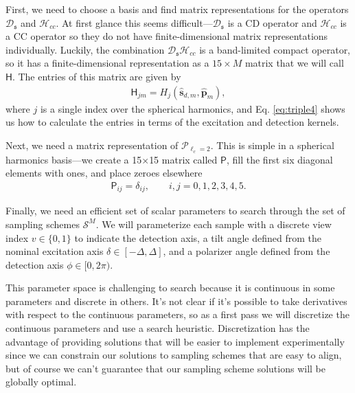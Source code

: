 \documentclass[11pt]{article}
\providecommand{\mc}[1]{\mathcal{#1}}
\providecommand{\mh}[1]{\mathbf{\hat{#1}}}
\providecommand{\mf}[1]{\mathfrak{#1}}
\providecommand{\ms}[1]{\mathsf{#1}}
\providecommand{\mbb}[1]{\mathbb{#1}}
\begin{document}
First, we need to choose a basis and find matrix representations for the
operators $\mc{D}_{\mf{s}}$ and $\mc{H}_{cc}$. At first glance this seems
difficult---$\mc{D}_{\mf{s}}$ is a CD operator and $\mc{H}_{cc}$ is a CC
operator so they do not have finite-dimensional matrix representations
individually. Luckily, the combination $\mc{D}_{\mf{s}} \mc{H}_{cc}$ is a
band-limited compact operator, so it has a finite-dimensional representation as
a $15\times M$ matrix that we will call $\ms{H}$. The entries of this matrix are
given by
\begin{align}
  \ms{H}_{jm} = H_j(\mh{s}_{d,m}, \mh{p}_m),
\end{align}
where $j$ is a single index over the spherical harmonics, and Eq.
\ref{eq:triple4} shows us how to calculate the entries in terms
of the excitation and detection kernels. 

Next, we need a matrix representation of $\mc{P}_{\ell_c=2}$. This is simple in
a spherical harmonics basis---we create a 15$\times$15 matrix called
$\ms{P}$, fill the first six diagonal elements with ones, and place zeroes
elsewhere
\begin{align}
  \ms{P}_{ij} = \delta_{ij}, \qquad i,j = 0,1,2,3,4,5.
\end{align}


Finally, we need an efficient set of scalar parameters to search through the set
of sampling schemes $\mc{S}^M$. We will parameterize each sample with a discrete
view index $v \in \{0, 1\}$ to indicate the detection axis, a tilt angle defined
from the nominal excitation axis $\delta \in [-\Delta, \Delta]$, and a polarizer
angle defined from the detection axis $\phi \in [0, 2\pi)$.

This parameter space is challenging to search because it is continuous in some
parameters and discrete in others. It's not clear if it's possible to take
derivatives with respect to the continuous parameters, so as a first pass we
will discretize the continuous parameters and use a search heuristic.
Discretization has the advantage of providing solutions that will be easier to
implement experimentally since we can constrain our solutions to sampling
schemes that are easy to align, but of course we can't guarantee that our
sampling scheme solutions will be globally optimal.
\end{document}
